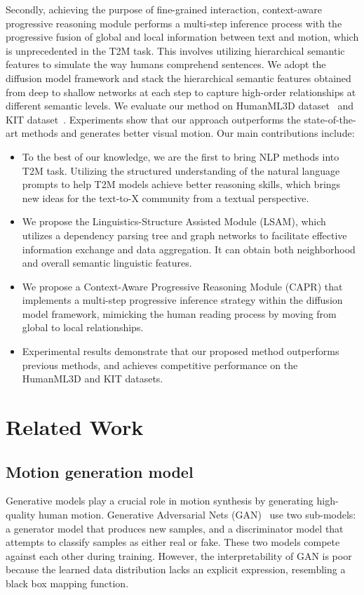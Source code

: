 \documentclass[10pt,twocolumn,letterpaper]{article}
\begin{document}
Secondly, achieving the purpose of fine-grained interaction, context-aware progressive reasoning module performs a multi-step inference process with the progressive fusion of global and local information between text and motion, which is unprecedented in the T2M task.  This involves utilizing hierarchical semantic features to simulate the way humans comprehend sentences. We adopt the diffusion model framework and stack the hierarchical semantic features obtained from deep to shallow networks at each step to capture high-order relationships at different semantic levels. 
We evaluate our method  on HumanML3D dataset~\cite{guo2022generating} and KIT dataset~\cite{plappert2016kit}. Experiments show that  our approach outperforms the state-of-the-art methods and generates better visual motion.
Our main contributions include:
\begin{itemize}
\item To the best of our knowledge, we are the first to bring NLP methods into T2M task. Utilizing the structured understanding of the natural language prompts to help T2M models achieve better reasoning skills, which brings new ideas for the text-to-X community from a textual perspective.
\item We propose the Linguistics-Structure Assisted Module (LSAM), which utilizes a dependency parsing tree and graph networks to facilitate effective information exchange and data aggregation. It can obtain both neighborhood and overall semantic linguistic features.
\item We propose a Context-Aware Progressive Reasoning Module (CAPR) that implements a multi-step progressive inference strategy within the diffusion model framework, mimicking the human reading process by moving from global to local relationships.
\item Experimental results demonstrate that our proposed method outperforms previous methods, and achieves competitive performance on the HumanML3D and KIT datasets.
\end{itemize}


\section{Related Work}

\subsection{Motion generation model}
Generative models play a crucial role in motion synthesis by generating high-quality human motion. Generative Adversarial Nets (GAN)~\cite{goodfellow2020generative} use two sub-models: a generator model that produces new samples, and a discriminator model that attempts to classify samples as either real or fake. These two models compete against each other during training. However, the interpretability of GAN is poor because the learned data distribution lacks an explicit expression, resembling a black box mapping function.
\end{document}
